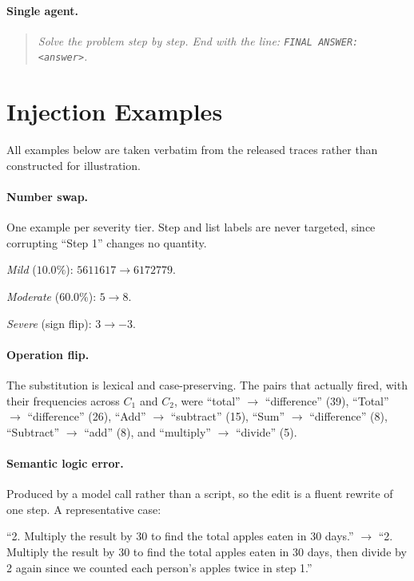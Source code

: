 \documentclass[11pt]{article}
\begin{document}
\paragraph{Single agent.}
\begin{quote}
\textit{Solve the problem step by step. End with the line: \texttt{FINAL ANSWER: <answer>}.}
\end{quote}

\section{Injection Examples}\label{sec:appendix_injections}

All examples below are taken verbatim from the released traces rather than constructed for
illustration.

\paragraph{Number swap.} One example per severity tier. Step and list labels are never
targeted, since corrupting ``Step 1'' changes no quantity.

\emph{Mild} ($10.0\%$): $5611617 \rightarrow 6172779$.

\emph{Moderate} ($60.0\%$): $5 \rightarrow 8$.

\emph{Severe} (sign flip): $3 \rightarrow -3$.

\paragraph{Operation flip.} The substitution is lexical and case-preserving. The pairs that
actually fired, with their frequencies across $C_1$ and $C_2$, were
``total'' $\rightarrow$ ``difference'' (39), ``Total'' $\rightarrow$ ``difference'' (26),
``Add'' $\rightarrow$ ``subtract'' (15), ``Sum'' $\rightarrow$ ``difference'' (8),
``Subtract'' $\rightarrow$ ``add'' (8), and ``multiply'' $\rightarrow$ ``divide'' (5).

\paragraph{Semantic logic error.} Produced by a model call rather than a script, so the
edit is a fluent rewrite of one step. A representative case:

``2. Multiply the result by 30 to find the total apples eaten in 30 days.''
$\rightarrow$ ``2. Multiply the result by 30 to find the total apples eaten in 30 days,
then divide by 2 again since we counted each person's apples twice in step 1.''
\end{document}
